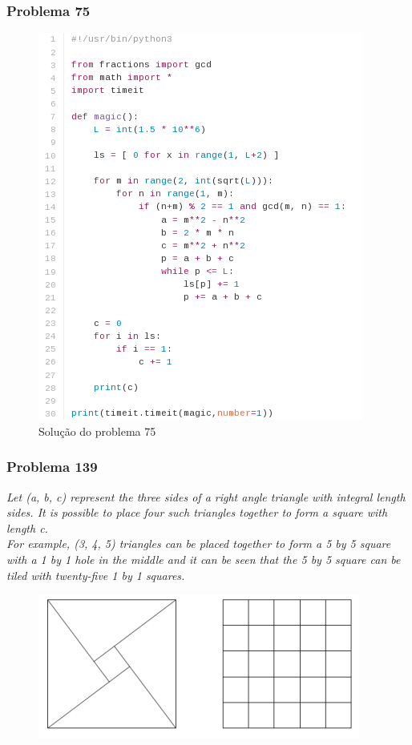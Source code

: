 \documentclass{beamer}
\begin{document}
\begin{frame}
    \frametitle{Problema 75}

    \begin{figure}[htpb]
        \centering
        \includegraphics[height=0.75\textheight]{images/prob75.png}
        \caption{Solução do problema 75}
    \end{figure}
\end{frame}


\begin{frame}
    \frametitle{Problema 139}

    \begin{center}
        \textit{
            Let (a, b, c) represent the three sides of a right angle triangle with integral length sides. It is possible to place four such triangles together to form a square with length c.\\
            For example, (3, 4, 5) triangles can be placed together to form a 5 by 5 square with a 1 by 1 hole in the middle and it can be seen that the 5 by 5 square can be tiled with twenty-five 1 by 1 squares.
        }
    \end{center}
    \begin{figure}[htpb]
        \centering
        \includegraphics[width=0.4\linewidth]{images/p139.png}
    \end{figure}
\end{frame}
\end{document}
